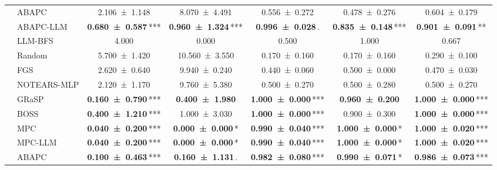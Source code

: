 \begin{table}[t]
{\begin{tabular}{llccccc}
     & ABAPC & \num{2.106 +- 1.148} & \num{8.070 +- 4.491} & \num{0.556 +- 0.272} & \num{0.478 +- 0.276} & \num{0.604 +- 0.179} \\
     & ABAPC-LLM & {\bfseries \num{0.680 +- 0.587}}\,\textnormal{***} & {\bfseries \num{0.960 +- 1.324}}\,\textnormal{***} & {\bfseries \num{0.996 +- 0.028}}\,\textnormal{.} & {\bfseries \num{0.835 +- 0.148}}\,\textnormal{***} & {\bfseries \num{0.901 +- 0.091}}\,\textnormal{**} \\
     & LLM-BFS & \num{4.000} & \num{0.000} & \num{0.500} & \num{1.000} & \num{0.667} \\
    \midrule
     & Random & \num{5.700 +- 1.420} & \num{10.560 +- 3.550} & \num{0.170 +- 0.160} & \num{0.170 +- 0.160} & \num{0.290 +- 0.100} \\
     & FGS & \num{2.620 +- 0.640} & \num{9.940 +- 0.240} & \num{0.440 +- 0.060} & \num{0.500 +- 0.000} & \num{0.470 +- 0.030} \\
     & NOTEARS-MLP & \num{2.120 +- 1.170} & \num{9.760 +- 5.380} & \num{0.500 +- 0.270} & \num{0.500 +- 0.280} & \num{0.500 +- 0.270} \\
     & GRaSP & {\bfseries \num{0.160 +- 0.790}}\,\textnormal{***} & {\bfseries \num{0.400 +- 1.980}} & {\bfseries \num{1.000 +- 0.000}}\,\textnormal{***} & {\bfseries \num{0.960 +- 0.200}} & {\bfseries \num{1.000 +- 0.000}}\,\textnormal{***} \\
     & BOSS & {\bfseries \num{0.400 +- 1.210}}\,\textnormal{***} & \num{1.000 +- 3.030} & {\bfseries \num{1.000 +- 0.000}}\,\textnormal{***} & \num{0.900 +- 0.300} & {\bfseries \num{1.000 +- 0.000}}\,\textnormal{***} \\
     & MPC & {\bfseries \num{0.040 +- 0.200}}\,\textnormal{***} & {\bfseries \num{0.000 +- 0.000}}\,\textnormal{*} & {\bfseries \num{0.990 +- 0.040}}\,\textnormal{***} & {\bfseries \num{1.000 +- 0.000}}\,\textnormal{*} & {\bfseries \num{1.000 +- 0.020}}\,\textnormal{***} \\
     & MPC-LLM & {\bfseries \num{0.040 +- 0.200}}\,\textnormal{***} & {\bfseries \num{0.000 +- 0.000}}\,\textnormal{*} & {\bfseries \num{0.990 +- 0.040}}\,\textnormal{***} & {\bfseries \num{1.000 +- 0.000}}\,\textnormal{*} & {\bfseries \num{1.000 +- 0.020}}\,\textnormal{***} \\
     & ABAPC & {\bfseries \num{0.100 +- 0.463}}\,\textnormal{***} & {\bfseries \num{0.160 +- 1.131}}\,\textnormal{.} & {\bfseries \num{0.982 +- 0.080}}\,\textnormal{***} & {\bfseries \num{0.990 +- 0.071}}\,\textnormal{*} & {\bfseries \num{0.986 +- 0.073}}\,\textnormal{***} \\

\end{tabular}}
\end{table}
